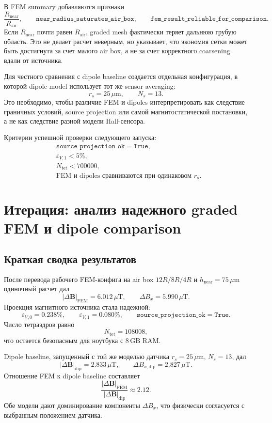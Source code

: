 \documentclass[12pt,a4paper]{article}
\begin{document}
В FEM summary добавляются признаки
\[
    \frac{R_{\mathrm{near}}}{R_{\mathrm{air}}},
    \qquad
    \texttt{near\_radius\_saturates\_air\_box},
    \qquad
    \texttt{fem\_result\_reliable\_for\_comparison}.
\]
Если \(R_{\mathrm{near}}\) почти равен \(R_{\mathrm{air}}\), graded mesh
фактически теряет дальнюю грубую область. Это не делает расчет неверным, но
указывает, что экономия сетки может быть достигнута за счет малого air box, а
не за счет корректного coarsening вдали от источника.

Для честного сравнения с dipole baseline создается отдельная конфигурация, в
которой dipole model использует тот же sensor averaging:
\[
    r_s=25\,\mu\mathrm{m},\qquad N_s=13.
\]
Это необходимо, чтобы различие FEM и dipoles интерпретировать как следствие
граничных условий, source projection или самой магнитостатической постановки, а
не как следствие разной модели Hall-сенсора.

Критерии успешной проверки следующего запуска:
\[
\begin{aligned}
&\texttt{source\_projection\_ok}=\texttt{True},\\
&\varepsilon_{V,1}<5\%,\\
&N_{\mathrm{tet}}<700000,\\
&\text{FEM и dipoles сравниваются при одинаковом } r_s.
\end{aligned}
\]

\section{Итерация: анализ надежного graded FEM и dipole comparison}

\subsection*{Краткая сводка результатов}

После перевода рабочего FEM-конфига на air box \(12R/8R/4R\) и
\(h_{\mathrm{near}}=75\,\mu\mathrm{m}\) одиночный расчет дал
\[
    |\Delta\mathbf B|_{\mathrm{FEM}} = 6.012\,\mu\mathrm{T},
    \qquad
    \Delta B_x = 5.990\,\mu\mathrm{T}.
\]
Проекция магнитного источника стала надежной:
\[
    \varepsilon_{V,0}=0.238\%,
    \qquad
    \varepsilon_{V,1}=0.080\%,
    \qquad
    \texttt{source\_projection\_ok}=\texttt{True}.
\]
Число тетраэдров равно
\[
    N_{\mathrm{tet}}=108008,
\]
что остается безопасным для ноутбука с \(8\,\mathrm{GB}\) RAM.

Dipole baseline, запущенный с той же моделью датчика
\(r_s=25\,\mu\mathrm{m}\), \(N_s=13\), дал
\[
    |\Delta\mathbf B|_{\mathrm{dip}} = 2.833\,\mu\mathrm{T},
    \qquad
    \Delta B_{x,\mathrm{dip}} = 2.827\,\mu\mathrm{T}.
\]
Отношение FEM к dipole baseline составляет
\[
    \frac{|\Delta\mathbf B|_{\mathrm{FEM}}}
         {|\Delta\mathbf B|_{\mathrm{dip}}}
    \approx 2.12.
\]
Обе модели дают доминирование компоненты \(\Delta B_x\), что физически
согласуется с выбранным положением датчика.
\end{document}
